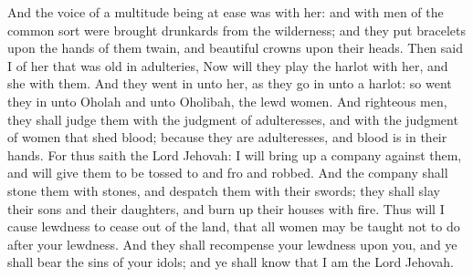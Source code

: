 And the voice of a multitude being at ease was with her: and with men of the common sort were brought drunkards from the wilderness; and they put bracelets upon the hands of them twain, and beautiful crowns upon their heads.  Then said I of her that was old in adulteries, Now will they play the harlot with her, and she with them. And they went in unto her, as they go in unto a harlot: so went they in unto Oholah and unto Oholibah, the lewd women. And righteous men, they shall judge them with the judgment of adulteresses, and with the judgment of women that shed blood; because they are adulteresses, and blood is in their hands. For thus saith the Lord Jehovah: I will bring up a company against them, and will give them to be tossed to and fro and robbed. And the company shall stone them with stones, and despatch them with their swords; they shall slay their sons and their daughters, and burn up their houses with fire. Thus will I cause lewdness to cease out of the land, that all women may be taught not to do after your lewdness. And they shall recompense your lewdness upon you, and ye shall bear the sins of your idols; and ye shall know that I am the Lord Jehovah. 

